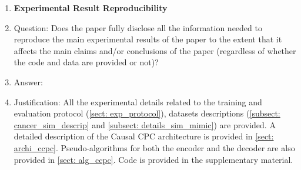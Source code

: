 \documentclass{article}
\theoremstyle{plain}
\theoremstyle{definition}
\theoremstyle{remark}
\begin{document}
\begin{enumerate}
    \item {\bf Experimental Result Reproducibility}
    \item[] Question: Does the paper fully disclose all the information needed to reproduce the main experimental results of the paper to the extent that it affects the main claims and/or conclusions of the paper (regardless of whether the code and data are provided or not)?
    \item[] Answer: \answerYes{}{} %
    \item[] Justification:  All the experimental details related to the training and evaluation protocol (\ref{sect: exp_protocol}), datasets descriptions (\ref{subsect: cancer_sim_descrip} and \ref{subsect: details_sim_mimic}) are provided. A detailed description of the Causal CPC architecture is provided in \ref{sect: archi_ccpc}. Pseudo-algorithms for both the encoder and the decoder are also provided in \ref{sect: alg_ccpc}. Code is provided in the supplementary material.


\end{enumerate}
\end{document}
